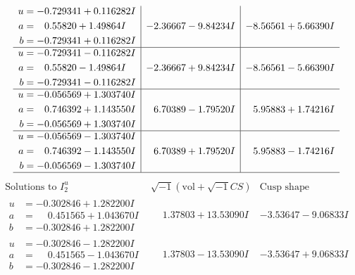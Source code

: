 \documentclass[1p]{elsarticle_modified}
\theoremstyle{definition}
\newcommand{\I}{\sqrt{-1}}
\begin{document}
$$\begin{array}{c|c|c}
\begin{aligned}
u &= -0.729341 + 0.116282 I \\
a &= \phantom{-}0.55820 + 1.49864 I \\
b &= -0.729341 + 0.116282 I\end{aligned}
 & -2.36667 - 9.84234 I & -8.56561 + 5.66390 I \\ \hline\begin{aligned}
u &= -0.729341 - 0.116282 I \\
a &= \phantom{-}0.55820 - 1.49864 I \\
b &= -0.729341 - 0.116282 I\end{aligned}
 & -2.36667 + 9.84234 I & -8.56561 - 5.66390 I \\ \hline\begin{aligned}
u &= -0.056569 + 1.303740 I \\
a &= \phantom{-}0.746392 + 1.143550 I \\
b &= -0.056569 + 1.303740 I\end{aligned}
 & \phantom{-}6.70389 - 1.79520 I & \phantom{-}5.95883 + 1.74216 I \\ \hline\begin{aligned}
u &= -0.056569 - 1.303740 I \\
a &= \phantom{-}0.746392 - 1.143550 I \\
b &= -0.056569 - 1.303740 I\end{aligned}
 & \phantom{-}6.70389 + 1.79520 I & \phantom{-}5.95883 - 1.74216 I\\
 \hline 
 \end{array}$$\newpage$$\begin{array}{c|c|c}  
\text{Solutions to }I^u_{2}& \I (\text{vol} + \sqrt{-1}CS) & \text{Cusp shape}\\
 \hline 
\begin{aligned}
u &= -0.302846 + 1.282200 I \\
a &= \phantom{-}0.451565 + 1.043670 I \\
b &= -0.302846 + 1.282200 I\end{aligned}
 & \phantom{-}1.37803 + 13.53090 I & -3.53647 - 9.06833 I \\ \hline\begin{aligned}
u &= -0.302846 - 1.282200 I \\
a &= \phantom{-}0.451565 - 1.043670 I \\
b &= -0.302846 - 1.282200 I\end{aligned}
 & \phantom{-}1.37803 - 13.53090 I & -3.53647 + 9.06833 I \\ \hline\begin{aligned}

\end{aligned}
\end{array}$$
\end{document}
